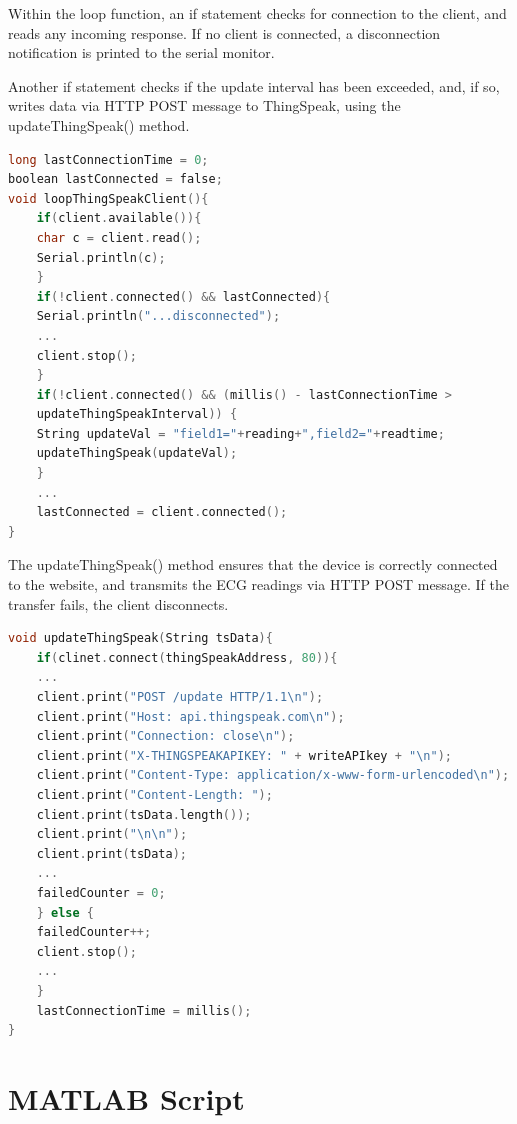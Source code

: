\documentclass[11pt,a4paper,headinclude=false,footinclude=false]{scrreprt}
\begin{document}
Within the loop function, an if statement checks for connection to the
client, and reads any incoming response. If no client is connected, a
disconnection notification is printed to the serial monitor.

Another if statement checks if the update interval has been exceeded,
and, if so, writes data via HTTP POST message to ThingSpeak, using the
updateThingSpeak() method.

\lstset{
    caption=ThingSpeakClient.ino Loop Function,
    basicstyle=\footnotesize, frame=tb,
    xleftmargin=.1\textwidth, xrightmargin=.1\textwidth
}
\begin{lstlisting}[language=C]
long lastConnectionTime = 0;
boolean lastConnected = false;
void loopThingSpeakClient(){
    if(client.available()){
    char c = client.read();
    Serial.println(c);
    }
    if(!client.connected() && lastConnected){
    Serial.println("...disconnected");
    ...
    client.stop();
    }
    if(!client.connected() && (millis() - lastConnectionTime >
    updateThingSpeakInterval)) {
    String updateVal = "field1="+reading+",field2="+readtime;
    updateThingSpeak(updateVal);
    }
    ...
    lastConnected = client.connected();
}
\end{lstlisting}

The updateThingSpeak() method ensures that the device is correctly
connected to the website, and transmits the ECG readings via HTTP POST
message. If the transfer fails, the client disconnects.

\lstset{
    caption=ThingSpeakClient.ino updateThingSpeak Function,
    basicstyle=\footnotesize, frame=tb,
    xleftmargin=.1\textwidth, xrightmargin=.1\textwidth
}
\begin{lstlisting}[language=C]
void updateThingSpeak(String tsData){
    if(clinet.connect(thingSpeakAddress, 80)){
    ...
    client.print("POST /update HTTP/1.1\n");
    client.print("Host: api.thingspeak.com\n");
    client.print("Connection: close\n");
    client.print("X-THINGSPEAKAPIKEY: " + writeAPIkey + "\n");
    client.print("Content-Type: application/x-www-form-urlencoded\n");
    client.print("Content-Length: ");
    client.print(tsData.length());
    client.print("\n\n");
    client.print(tsData);
    ...
    failedCounter = 0;
    } else {
    failedCounter++;
    client.stop();
    ...
    }
    lastConnectionTime = millis();
}
\end{lstlisting}

\hypertarget{matlab-script}{%
\section{MATLAB Script}\label{matlab-script}}
\end{document}
